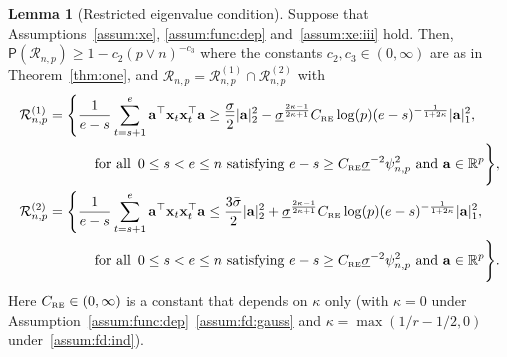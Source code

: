 \documentclass[11pt, a4paper]{article}
\newcommand{\mbf}{\mathbf}
\newcommand{\mc}{\mathcal}
\newcommand{\p}{\mathsf{P}}
\newcommand{\R}{\mathbb{R}}
\newcommand{\crsc}{C_{\text{\tiny \upshape RE}}}
\theoremstyle{definition}
\theoremstyle{definition}
\theoremstyle{definition}
\newtheorem{lem}[thm]{Lemma}
\theoremstyle{definition}
\theoremstyle{definition}
\theoremstyle{remark}
\theoremstyle{definition}
\theoremstyle{definition}
\theoremstyle{definition}
\begin{document}
\begin{lem}[Restricted eigenvalue condition]
	\label{lem:rsc}
	Suppose that Assumptions~\ref{assum:xe}, \ref{assum:func:dep} 
    and~\ref{assum:xe:iii} hold.
	Then, $\p(\mc R_{n, p}) \ge 1 - c_2(p \vee n)^{-c_3}$ where the constants $c_2, c_3 \in (0, \infty)$ are as in Theorem~\ref{thm:one}, and $\mc R_{n, p} = \mc R^{(1)}_{n, p} \cap \mc R^{(2)}_{n, p}$ with
	\begin{align*}
	\mc R^{(1)}_{n, p} &= \Biggl\{ \frac{1}{e - s} \sum_{t = s + 1}^e \mbf a^\top \mbf x_t \mbf x_t^\top \mbf a 
	\ge \frac{\underline{\sigma}}{2} \vert \mbf a \vert_2^2 - {\underline{\sigma}^{\frac{2\kappa -1}{2\kappa+1}}} \crsc \log(p) (e - s)^{-\frac{1}{1 + 2\kappa}} \vert \mbf a \vert_1^2, 
	\\
	& \qquad \quad \text{ for all }\, 0 \le s < e \le n \text{ satisfying } e - s \ge \crsc \underline{\sigma}^{-2} \psi^2_{n, p} \text{ and } \mbf a \in \R^p \Biggr\},
	\\
	\mc R^{(2)}_{n, p} &= \Biggl\{ \frac{1}{e - s}  \sum_{t = s + 1}^e \mbf a^\top \mbf x_t \mbf x_t^\top \mbf a 
	\le \frac{3 \bar{\sigma}}{2} \vert \mbf a \vert_2^2 + {\underline{\sigma}^{\frac{2\kappa -1}{2\kappa+1}}} \crsc \log(p) (e - s)^{-\frac{1}{1 + 2\kappa}} \vert \mbf a \vert_1^2,
	\\
	& \qquad \quad \text{ for all } \, 0 \le s < e \le n \text{ satisfying } e - s \ge \crsc \underline{\sigma}^{-2} \psi^2_{n, p} \text{ and } \mbf a \in \R^p \Biggr\}.
	\end{align*}
	Here $\crsc \in (0, \infty)$ is a constant that depends on $\kappa$ only (with $\kappa = 0$ under Assumption~\ref{assum:func:dep}~\ref{assum:fd:gauss} and $\kappa = \max(1/r - 1/2, 0)$ under~\ref{assum:fd:ind}).
\end{lem}
\end{document}

